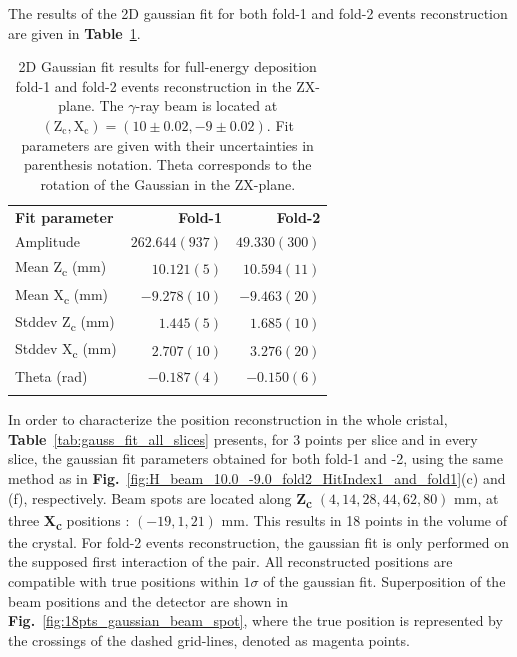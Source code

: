 The results of the 2D gaussian fit for both fold-1 and fold-2 events reconstruction are given in \textbf{Table}~\ref{tab:gaussian_fit_results_combined}.

\begin{table}[ht]
\centering
\caption{2D Gaussian fit results for full-energy deposition fold-1 and fold-2 events reconstruction in the ZX-plane. The $\gamma$-ray beam is located at $(\text{Z}_\text{c}, \text{X}_\text{c}) = (10\pm0.02, -9\pm0.02)$. Fit parameters are given with their uncertainties in parenthesis notation. Theta corresponds to the rotation of the Gaussian in the ZX-plane.}
\label{tab:gaussian_fit_results_combined}
\begin{tabular}{lrr}
\hline\noalign{\smallskip}
\textbf{Fit parameter} & \textbf{Fold-1} & \textbf{Fold-2} \\
\noalign{\smallskip}\hline\noalign{\smallskip}
Amplitude & $262.644(937)$ & $49.330(300)$ \\
Mean Z\textsubscript{c} (mm) & $10.121(5)$ & $10.594(11)$ \\
Mean X\textsubscript{c} (mm) & $-9.278(10)$ & $-9.463(20)$ \\
Stddev Z\textsubscript{c} (mm) & $1.445(5)$ & $1.685(10)$ \\
Stddev X\textsubscript{c} (mm) & $2.707(10)$ & $3.276(20)$ \\
Theta (rad) & $-0.187(4)$ & $-0.150(6)$ \\
\noalign{\smallskip}\hline
\end{tabular}
\end{table}

In order to characterize the position reconstruction in the whole cristal, \textbf{Table}~\ref{tab:gauss_fit_all_slices} presents, for 3 points per slice and in every slice, the gaussian fit parameters obtained for both fold-1 and -2, using the same method as in \textbf{Fig.}~\ref{fig:H_beam_10.0_-9.0_fold2_HitIndex1_and_fold1}(c) and (f), respectively. Beam spots are located along \textbf{Z\textsubscript{c}} $(4, 14, 28, 44, 62, 80)$ mm, at three \textbf{X\textsubscript{c}} positions : $(-19, 1, 21)$ mm. This results in 18 points in the volume of the crystal. For fold-2 events reconstruction, the gaussian fit is only performed on the supposed first interaction of the pair. All reconstructed positions are compatible with true positions within $1\sigma$ of the gaussian fit. Superposition of the beam positions and the detector are shown in \textbf{Fig.}~\ref{fig:18pts_gaussian_beam_spot}, where the true position is represented by the crossings of the dashed grid-lines, denoted as magenta points.

